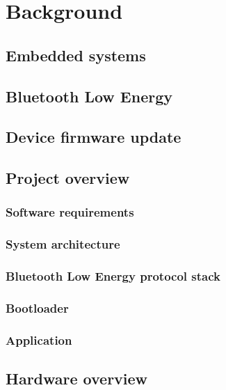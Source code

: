 \section{Background}

\subsection{Embedded systems}

\subsection{Bluetooth Low Energy}

\subsection{Device firmware update}

\subsection{Project overview}
\subsubsection{Software requirements}
\subsubsection{System architecture}
\subsubsection{Bluetooth Low Energy protocol stack}
\subsubsection{Bootloader}
\subsubsection{Application}

\subsection{Hardware overview}